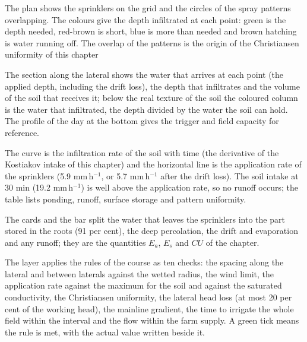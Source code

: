 The plan shows the sprinklers on the grid and the circles of the spray patterns overlapping. The colours give the depth infiltrated at each point: green is the depth needed, red-brown is short, blue is more than needed and brown hatching is water running off. The overlap of the patterns is the origin of the Christiansen uniformity of this chapter


The section along the lateral shows the water that arrives at each point (the applied depth, including the drift loss), the depth that infiltrates and the volume of the soil that receives it; below the real texture of the soil the coloured column is the water that infiltrated, the depth divided by the water the soil can hold. The profile of the day at the bottom gives the trigger and field capacity for reference.


The curve is the infiltration rate of the soil with time (the derivative of the Kostiakov intake of this chapter) and the horizontal line is the application rate of the sprinklers (5.9 mm\,h$^{-1}$, or 5.7 mm\,h$^{-1}$ after the drift loss). The soil intake at 30 min (19.2 mm\,h$^{-1}$) is well above the application rate, so no runoff occurs; the table lists ponding, runoff, surface storage and pattern uniformity.


The cards and the bar split the water that leaves the sprinklers into the part stored in the roots (91 per cent), the deep percolation, the drift and evaporation and any runoff; they are the quantities $E_a$, $E_s$ and $CU$ of the chapter.


The layer applies the rules of the course as ten checks: the spacing along the lateral and between laterals against the wetted radius, the wind limit, the application rate against the maximum for the soil and against the saturated conductivity, the Christiansen uniformity, the lateral head loss (at most 20 per cent of the working head), the mainline gradient, the time to irrigate the whole field within the interval and the flow within the farm supply. A green tick means the rule is met, with the actual value written beside it.

